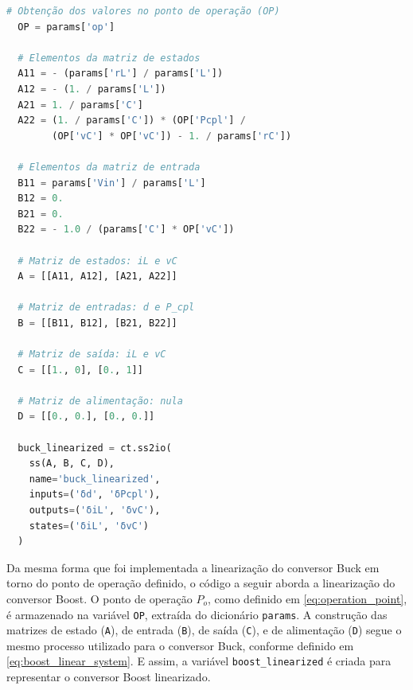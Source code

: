 \vspace{8pt}
\begin{lstlisting}[language=Python, caption={Implementação do conversor Buck linearizado.}, label=cod:buck_linear]
  # Obtenção dos valores no ponto de operação (OP)
  OP = params['op']

  # Elementos da matriz de estados
  A11 = - (params['rL'] / params['L'])
  A12 = - (1. / params['L'])
  A21 = 1. / params['C']
  A22 = (1. / params['C']) * (OP['Pcpl'] /
        (OP['vC'] * OP['vC']) - 1. / params['rC'])

  # Elementos da matriz de entrada
  B11 = params['Vin'] / params['L']
  B12 = 0.
  B21 = 0.
  B22 = - 1.0 / (params['C'] * OP['vC'])

  # Matriz de estados: iL e vC
  A = [[A11, A12], [A21, A22]]

  # Matriz de entradas: d e P_cpl
  B = [[B11, B12], [B21, B22]]

  # Matriz de saída: iL e vC
  C = [[1., 0], [0., 1]]

  # Matriz de alimentação: nula
  D = [[0., 0.], [0., 0.]]

  buck_linearized = ct.ss2io(
    ss(A, B, C, D),
    name='buck_linearized',
    inputs=('δd', 'δPcpl'),
    outputs=('δiL', 'δvC'),
    states=('δiL', 'δvC')
  )
\end{lstlisting}

Da mesma forma que foi implementada a linearização do conversor Buck em torno do ponto de operação definido, o código a seguir aborda a linearização do conversor Boost. O ponto de operação $P_o$, como definido em \eqref{eq:operation_point}, é armazenado na variável \texttt{OP}, extraída do dicionário \texttt{params}. A construção das matrizes de estado (\texttt{A}), de entrada (\texttt{B}), de saída (\texttt{C}), e de alimentação (\texttt{D}) segue o mesmo processo utilizado para o conversor Buck, conforme definido em \eqref{eq:boost_linear_system}. E assim, a variável \texttt{boost\_linearized} é criada para representar o conversor Boost linearizado.

